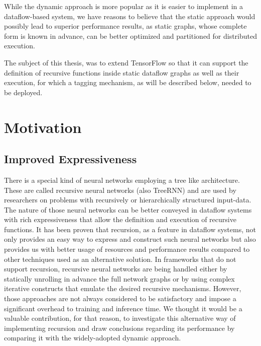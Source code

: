 \documentclass[ack,preface]{dithesis}
\begin{document}
While the dynamic approach is more popular as it is easier to implement in a dataflow-based system,  we have reasons to believe that the static approach would possibly lead to superior performance results, as static graphs, whose complete form is known in advance, can  be better optimized and partitioned  for distributed execution.

The subject of this thesis, was to extend TensorFlow so that it can support the definition of recursive functions inside static dataflow graphs as well as their execution, for which a tagging mechanism, as will be described below, needed to be deployed.


    \section{Motivation}

    \subsection{Improved Expressiveness}
	
	There is a special kind of neural networks employing a tree like architecture. These are called recursive neural networks (also TreeRNN) and are used by researchers on problems with recursively or hierarchically structured input-data. The nature of those neural networks can be better conveyed in dataflow systems with rich expressiveness that allow the definition and execution of recursive functions. It has been proven \cite{Jeong:2018} that recursion, as a feature in dataflow systems, not only provides an easy way to express and construct such neural networks but also provides us with better usage of resources and performance results compared to other techniques used as an alternative solution. In frameworks that do not support recursion, recursive neural networks are being handled either by statically unrolling in advance the full network graphs  or by using complex iterative constructs that emulate the desired recursive mechanisms. However, those approaches are not always considered to be satisfactory and impose a significant overhead to training and inference time. 
We thought it would be a valuable contribution, for that reason, to investigate this alternative way of implementing recursion and draw conclusions regarding its performance by comparing it with the widely-adopted dynamic approach.
\end{document}
